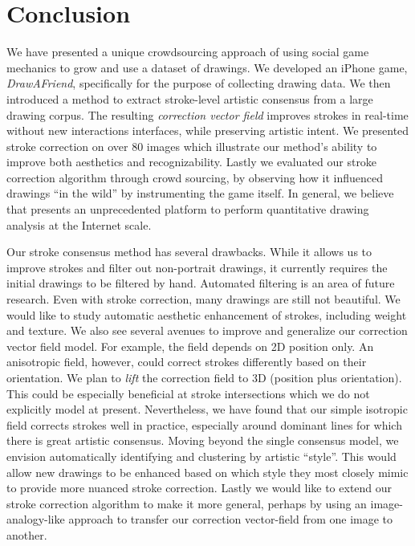 \section{Conclusion}

We have presented a unique crowdsourcing approach of using social game mechanics to grow and use a dataset of drawings. We developed an iPhone game, \emph{DrawAFriend}, specifically for the purpose of
collecting drawing data. We then introduced a method to extract
stroke-level artistic consensus from a large drawing corpus. The
resulting \emph{correction vector field} improves strokes in
real-time without new interactions interfaces, while preserving artistic
intent. We presented stroke correction on over 80 images which illustrate our method's ability to improve both
aesthetics and recognizability. Lastly we evaluated our stroke correction algorithm through crowd sourcing, by observing how it influenced drawings ``in the wild'' by instrumenting the game itself. In general, we believe that \daf presents an unprecedented platform to perform quantitative drawing analysis at the Internet scale.

Our stroke consensus method has several drawbacks. While it allows us to improve strokes and filter out non-portrait drawings, it currently requires the initial drawings to be filtered by hand. Automated filtering is an area of future research. Even with stroke
correction, many drawings are still not beautiful. We would like to
study automatic aesthetic enhancement of strokes, including weight
and texture. We also see several avenues to improve and generalize
our correction vector field model. For example, the field depends on
2D position only. An anisotropic field, however, could correct strokes
differently based on their orientation. We plan to {\em lift} the correction field to
3D (position plus orientation). This could be especially
beneficial at stroke intersections which we do not explicitly model
at present. Nevertheless, we have found that our simple isotropic
field corrects strokes well in practice, especially
around dominant lines for which there is great artistic consensus.
Moving beyond the single consensus model, we envision automatically
identifying and clustering by artistic ``style''. This would allow new drawings to
be enhanced based on which style they most closely mimic to provide more
nuanced stroke correction. Lastly we would like to extend our stroke correction algorithm to make it more general, perhaps by using an image-analogy-like approach to transfer our correction vector-field from one image to another.

